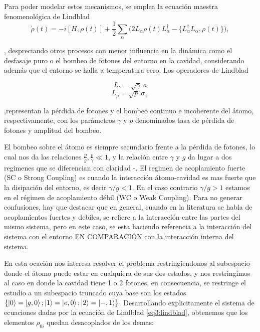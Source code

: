 Para poder modelar estos mecanismos, se emplea la ecuación maestra fenomenológica de Lindblad
\begin{equation}\label{eq3:lindblad}
\dot{\rho}(t) = -i [H, \rho(t)] + \frac{1}{2} \sum_\alpha \big( 2L_\alpha \rho(t) L_\alpha^{\dagger} - \{ L_\alpha^{\dagger}L_\alpha, \rho(t) \} \big),
\end{equation}

, despreciando otros procesos con menor influencia en la dinámica como el desfasaje puro o el bombeo de fotones del entorno en la cavidad, considerando además que el entorno se halla a temperatura cero. Los operadores de Lindblad

\begin{equation}
L_\gamma = \sqrt{\gamma} \ a
\end{equation}
\begin{equation}
L_p = \sqrt{p} \ \sigma_+
\end{equation}

,representan la pérdida de fotones y el bombeo continuo e incoherente del átomo, respectivamente, con los parámetros $\gamma$ y $p$ denominados tasa de pérdida de fotones y amplitud del bombeo. 

El bombeo sobre el átomo es siempre secundario frente a la pérdida de fotones, lo cual nos da las relaciones $\frac{p}{g},\frac{p}{\gamma} \ll 1$, y la relación entre $\gamma$ y $g$ da lugar a dos regimenes que se diferencian con claridad \cite{50}-\cite{54}. El regimen de acoplamiento fuerte (SC o Strong Coupling) es cuando la interacción átomo-cavidad es mas fuerte que la disipación del entorno, es decir $\gamma /g <1$. En el caso contrario $\gamma/g>1$ estamos en el régimen de acoplamiento débil (WC o Weak Coupling). Para no generar confusiones, hay que destacar que en general, cuando en la literatura se habla de acoplamientos fuertes y debiles, se refiere a la interacción entre las partes del mismo sistema, pero en este caso, se esta haciendo referencia a la interacción del sistema con el entorno EN COMPARACIÓN con la interacción interna del sistema.

En esta ocación nos interesa resolver el problema restringiendonos al subespacio donde el átomo puede estar en cualquiera de sus dos estados, y nos restringimos al caso en donde la cavidad tiene 1 o 2 fotones, en consecuencia, se restringe el estudio a un subespacio truncado cuya base son los estados $\{ \ket{0}=\ket{g,0} ; \ket{1}=\ket{e,0} ; \ket{2}=\ket{-,1} \}$. Desarrollando explicitamente el sistema de ecuaciones dadas por la ecuación de Lindblad \ref{eq3:lindblad}, obtenemos que los elementos $\rho_{0i}$ quedan desacoplados de los demas:

